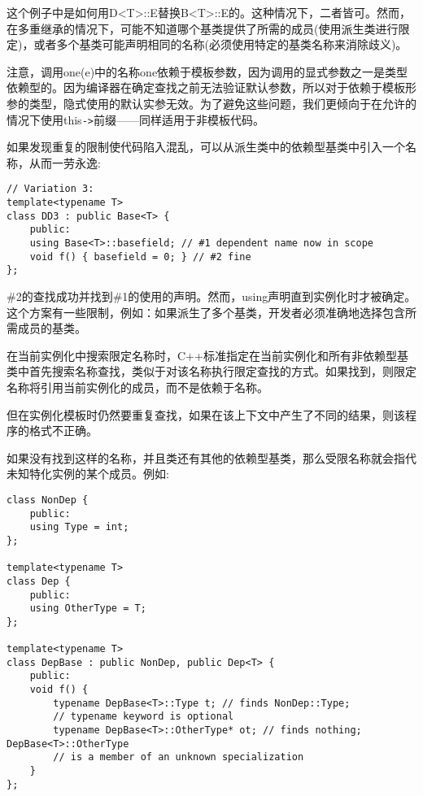 这个例子中是如何用D<T>::E替换B<T>::E的。这种情况下，二者皆可。然而，在多重继承的情况下，可能不知道哪个基类提供了所需的成员(使用派生类进行限定)，或者多个基类可能声明相同的名称(必须使用特定的基类名称来消除歧义)。

注意，调用one(e)中的名称one依赖于模板参数，因为调用的显式参数之一是类型依赖型的。因为编译器在确定查找之前无法验证默认参数，所以对于依赖于模板形参的类型，隐式使用的默认实参无效。为了避免这些问题，我们更倾向于在允许的情况下使用this\texttt{->}前缀——同样适用于非模板代码。

如果发现重复的限制使代码陷入混乱，可以从派生类中的依赖型基类中引入一个名称，从而一劳永逸:

\begin{lstlisting}[style=styleCXX]
// Variation 3:
template<typename T>
class DD3 : public Base<T> {
	public:
	using Base<T>::basefield; // #1 dependent name now in scope
	void f() { basefield = 0; } // #2 fine
};
\end{lstlisting}

\#2的查找成功并找到\#1的使用的声明。然而，using声明直到实例化时才被确定。这个方案有一些限制，例如：如果派生了多个基类，开发者必须准确地选择包含所需成员的基类。

在当前实例化中搜索限定名称时，C++标准指定在当前实例化和所有非依赖型基类中首先搜索名称查找，类似于对该名称执行限定查找的方式。如果找到，则限定名称将引用当前实例化的成员，而不是依赖于名称。

\begin{tcolorbox}[colback=webgreen!5!white,colframe=webgreen!75!black]
\hspace*{0.75cm}但在实例化模板时仍然要重复查找，如果在该上下文中产生了不同的结果，则该程序的格式不正确。
\end{tcolorbox}

如果没有找到这样的名称，并且类还有其他的依赖型基类，那么受限名称就会指代未知特化实例的某个成员。例如:

\begin{lstlisting}[style=styleCXX]
class NonDep {
	public:
	using Type = int;
};

template<typename T>
class Dep {
	public:
	using OtherType = T;
};

template<typename T>
class DepBase : public NonDep, public Dep<T> {
	public:
	void f() {
		typename DepBase<T>::Type t; // finds NonDep::Type;
		// typename keyword is optional
		typename DepBase<T>::OtherType* ot; // finds nothing; DepBase<T>::OtherType
		// is a member of an unknown specialization
	}
};
\end{lstlisting}























